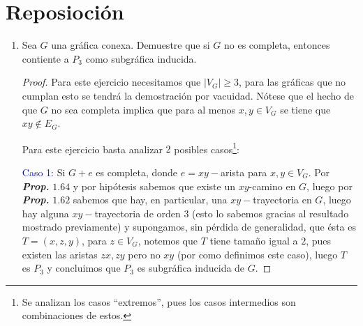 \documentclass{article}
\begin{document}
\section*{\LARGE{Reposioción}}
\begin{enumerate}
\item {} Sea $G$ una gr\'afica conexa. Demuestre
  que si $G$ no es completa, entonces contiente a $P_3$ como subgr\'afica inducida.
    \renewcommand\qedsymbol{QED}
  \begin{proof} Para este ejercicio necesitamos que $|V_G| \geq 3$, para las
    gr\'aficas que no cumplan esto se tendr\'a la demostraci\'on por vacuidad.
    Nótese que el hecho de que $G$ no sea completa implica que para al
    menos $x,y \in V_G$ se tiene que $xy \notin E_G$.

        \begin{center}
    \end{center}
    
    Para este ejercicio basta analizar $2$ posibles casos\footnote{Se
      analizan los casos ``extremos'', pues los casos intermedios son combinaciones
      de estos.}:
    
    \textcolor{blue}{Caso 1:} Si $G + e$ es completa, donde $e = xy-$arista para
    $x,y \in V_G$. Por \textbf{\textit{Prop.}} $\mathbf{1.64}$ y por hipótesis
    sabemos que existe un $xy$-camino en $G$, luego por \textbf{\textit{Prop.}}
    $\mathbf{1.62}$ sabemos que hay, en particular, una $xy-$trayectoria en $G$,
    luego hay alguna $xy-$trayectoria de orden $3$ (esto lo sabemos gracias al
    resultado mostrado previamente) y supongamos, sin p\'erdida de generalidad,
    que \'esta es $T = (x,z,y)$, para $z \in V_G$, notemos que $T$ tiene tamaño
    igual a $2$, pues existen las aristas $zx, zy$ pero no $xy$ (por como definimos
    este caso), luego $T$ es $P_3$ y concluimos que $P_3$ es subgr\'afica inducida
    de $G$.
    

\end{proof}
\end{enumerate}
\end{document}
